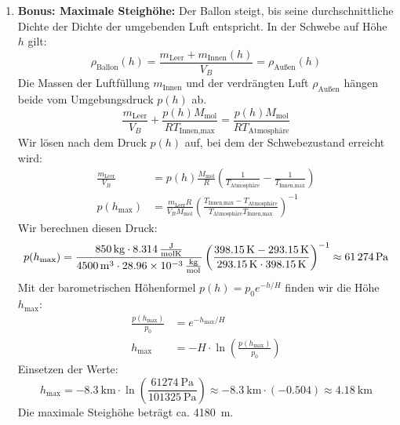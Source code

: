\documentclass[ngerman]{scrreprt}
\newenvironment{loesungbox}[1]
  {\needspace{5\baselineskip}\begin{loesungboxstyle}[frametitle={#1}]}
  {\end{loesungboxstyle}}
\begin{document}
\begin{loesungbox}{Lösung zu \Cref{aufg:ballonfahrt}}
\begin{enumerate}
    \item \textbf{Bonus: Maximale Steighöhe:}
    Der Ballon steigt, bis seine durchschnittliche Dichte der Dichte der umgebenden Luft entspricht. In der Schwebe auf Höhe $h$ gilt:
    \begin{equation}
        \rho_{\text{Ballon}}(h) = \frac{m_{\text{Leer}} + m_{\text{Innen}}(h)}{V_B} = \rho_{\text{Außen}}(h)
    \end{equation}
    Die Massen der Luftfüllung $m_{\text{Innen}}$ und der verdrängten Luft $\rho_{\text{Außen}}$ hängen beide vom Umgebungsdruck $p(h)$ ab.
    \begin{equation}
        \frac{m_{\text{Leer}}}{V_B} + \frac{p(h) M_{\text{mol}}}{R T_{\text{Innen,max}}} = \frac{p(h) M_{\text{mol}}}{R T_{\text{Atmosphäre}}}
    \end{equation}
    Wir lösen nach dem Druck $p(h)$ auf, bei dem der Schwebezustand erreicht wird:
    \begin{align}
        \frac{m_{\text{Leer}}}{V_B} &= p(h) \frac{M_{\text{mol}}}{R} \left( \frac{1}{T_{\text{Atmosphäre}}} - \frac{1}{T_{\text{Innen,max}}} \right) \\
        p(h_{\text{max}}) &= \frac{m_{\text{Leer}} R}{V_B M_{\text{mol}}} \left( \frac{T_{\text{Innen,max}} - T_{\text{Atmosphäre}}}{T_{\text{Atmosphäre}} T_{\text{Innen,max}}} \right)^{-1}
    \end{align}
    Wir berechnen diesen Druck:
    \begin{equation}
        p(h_{\text{max}}) = \frac{\SI{850}{\kilo\gram} \cdot \SI{8.314}{\frac{\joule}{\mol\kelvin}}}{\SI{4500}{\meter\cubed} \cdot \SI{28.96e-3}{\frac{\kilo\gram}{\mol}}} \left( \frac{\SI{398.15}{\kelvin} - \SI{293.15}{\kelvin}}{\SI{293.15}{\kelvin} \cdot \SI{398.15}{\kelvin}} \right)^{-1} \approx \SI{61274}{\pascal}
    \end{equation}
    Mit der barometrischen Höhenformel $p(h) = p_0 e^{-h/H}$ finden wir die Höhe $h_{\text{max}}$:
    \begin{align}
        \frac{p(h_{\text{max}})}{p_0} &= e^{-h_{\text{max}}/H} \\
        h_{\text{max}} &= -H \cdot \ln\left(\frac{p(h_{\text{max}})}{p_0}\right)
    \end{align}
    Einsetzen der Werte:
    \begin{equation}
        h_{\text{max}} = -\SI{8.3}{\kilo\meter} \cdot \ln\left(\frac{\SI{61274}{\pascal}}{\SI{101325}{\pascal}}\right) \approx -\SI{8.3}{\kilo\meter} \cdot (-0.504) \approx \SI{4.18}{\kilo\meter}
    \end{equation}
    Die maximale Steighöhe beträgt ca. \SI{4180}{\meter}.
\end{enumerate}
\end{loesungbox}
\end{document}
